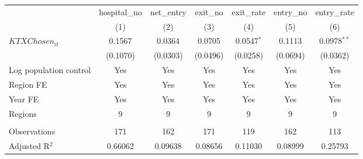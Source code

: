 \begingroup
\centering
\begin{tabular}{lcccccc}
   \toprule
                          & hospital\_no  & net\_entry  & exit\_no  & exit\_rate   & entry\_no  & entry\_rate \\    
                          & (1)           & (2)         & (3)       & (4)          & (5)        & (6)\\  
   \midrule 
   $KTXChosen_{it}$       & 0.1567        & 0.0364      & 0.0705    & 0.0547$^{*}$ & 0.1113     & 0.0978$^{**}$\\   
                          & (0.1070)      & (0.0303)    & (0.0496)  & (0.0258)     & (0.0694)   & (0.0362)\\   
   Log population control & Yes           & Yes         & Yes       & Yes          & Yes        & Yes\\  
   Region FE              & Yes           & Yes         & Yes       & Yes          & Yes        & Yes\\  
   Year FE                & Yes           & Yes         & Yes       & Yes          & Yes        & Yes\\  
   Regions                & 9             & 9           & 9         & 9            & 9          & 9\\  
    \\
   Observations           & 171           & 162         & 171       & 119          & 162        & 113\\  
   Adjusted R$^2$         & 0.66062       & 0.09638     & 0.08656   & 0.11030      & 0.08999    & 0.25793\\  
   \bottomrule
\end{tabular}
\par\endgroup
